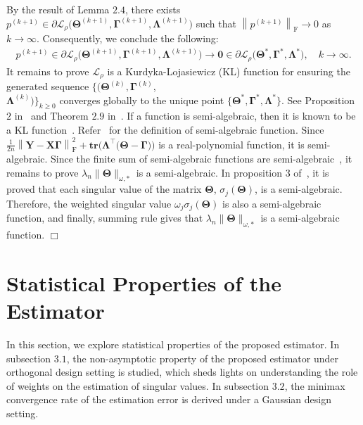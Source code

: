 \documentclass[alpha-refs]{wiley-article}
\begin{document}
By the result of Lemma $2.4$, there exists $p^{(k+1)}\in\partial \mathcal{L}_{\rho} \big( \boldsymbol{\Theta}^{(k+1)},\boldsymbol{\Gamma}^{(k+1)},\boldsymbol{\Lambda}^{(k+1)} \big)$ such that $\left\|p^{(k+1)}\right\|_{\text{F}}\rightarrow{0}$ as $k\rightarrow{\infty}$.
Consequently, we conclude the following:
\begin{align*}
    p^{(k+1)}\in\partial \mathcal{L}_{\rho} \big( \boldsymbol{\Theta}^{(k+1)},\boldsymbol{\Gamma}^{(k+1)},\boldsymbol{\Lambda}^{(k+1)} \big) \rightarrow{ \boldsymbol{0}\in\partial \mathcal{L}_{\rho} \big( \boldsymbol{\Theta}^{*},\boldsymbol{\Gamma}^{*},\boldsymbol{\Lambda}^{*} \big)}, \quad
    k\rightarrow{\infty}.
\end{align*}
It remains to prove $\mathcal{L}_{\rho}$ is a Kurdyka-Lojasiewicz (KL) function for ensuring the generated sequence
$\{(\boldsymbol{\Theta}^{(k)},\boldsymbol{\Gamma}^{(k)}$,\\
$\boldsymbol{\Lambda}^{(k)})\}_{k \geq 0}$ converges globally to the unique point
$\{\boldsymbol{\Theta}^{*},\boldsymbol{\Gamma}^{*},\boldsymbol{\Lambda}^{*}\}$.
See Proposition $2$ in~\citet{wang2019global} and Theorem $2.9$ in~\citet{attouch2013convergence}.
If a function is semi-algebraic, then it is known to be a KL function~\citep{attouch2013convergence,sun2017global}.
Refer~\citet{sun2017global} for the definition of semi-algebraic function.
Since $\frac{1}{2n}\left\| \boldsymbol{Y}-\boldsymbol{X\Gamma} \right\|_{\text{F}}^{2}+\textbf{tr}\big( \boldsymbol{\Lambda}^{\top}\big( \boldsymbol{\Theta}-\boldsymbol{\Gamma} \big)\big)$ is a real-polynomial function, it is semi-algebraic.
Since the finite sum of semi-algebraic functions are semi-algebraic~\citep{attouch2013convergence}, it remains to prove $\lambda_{n}\|\boldsymbol{\Theta}\|_{\omega,*}$ is a semi-algebraic.
In proposition $3$ of~\citet{sun2017global}, it is proved that each singular value of the matrix $\boldsymbol{\Theta}$, $\sigma_{j}(\boldsymbol{\Theta})$, is a semi-algebraic.
Therefore, the weighted singular value $\omega_{j}\sigma_{j}(\boldsymbol{\Theta})$ is also a semi-algebraic function, and finally, summing rule gives that $\lambda_{n}\|\boldsymbol{\Theta}\|_{\omega,*}$ is a semi-algebraic function.
\qquad \qquad \qquad \qquad \qquad \qquad \qquad \qquad \qquad \qquad \qquad \qquad \qquad \qquad \qquad \qquad \qquad \qquad \qquad \qquad \qquad \qquad \quad $\Box$

\section{Statistical Properties of the Estimator}
In this section, we explore statistical properties of the proposed estimator.
In subsection $3.1$, the non-asymptotic property of the proposed estimator under orthogonal design setting is studied, which sheds lights on understanding the role of weights on the estimation of singular values.
In subsection $3.2$, the minimax convergence rate of the estimation error is derived under a Gaussian design setting.
\end{document}
